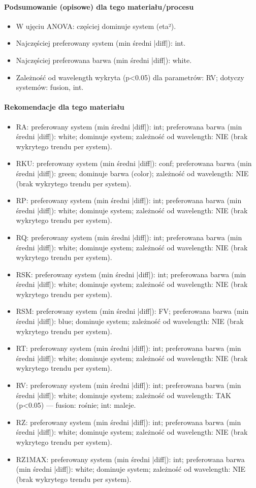 \documentclass[
  10pt,
]{article}
\begin{document}
\paragraph{Podsumowanie (opisowe) dla tego materiału/procesu}
\begin{itemize}
\item W ujęciu ANOVA: częściej dominuje system (eta²).
\item Najczęściej preferowany system (min średni |diff|): int.
\item Najczęściej preferowana barwa (min średni |diff|): white.
\item Zależność od wavelength wykryta (p<0.05) dla parametrów: RV; dotyczy systemów: fusion, int.
\end{itemize}
\paragraph{Rekomendacje dla tego materiału}
\begin{itemize}
\item RA: preferowany system (min średni |diff|): int; preferowana barwa (min średni |diff|): white; dominuje system; zależność od wavelength: NIE (brak wykrytego trendu per system).
\item RKU: preferowany system (min średni |diff|): conf; preferowana barwa (min średni |diff|): green; dominuje barwa (color); zależność od wavelength: NIE (brak wykrytego trendu per system).
\item RP: preferowany system (min średni |diff|): int; preferowana barwa (min średni |diff|): white; dominuje system; zależność od wavelength: NIE (brak wykrytego trendu per system).
\item RQ: preferowany system (min średni |diff|): int; preferowana barwa (min średni |diff|): white; dominuje system; zależność od wavelength: NIE (brak wykrytego trendu per system).
\item RSK: preferowany system (min średni |diff|): int; preferowana barwa (min średni |diff|): white; dominuje system; zależność od wavelength: NIE (brak wykrytego trendu per system).
\item RSM: preferowany system (min średni |diff|): FV; preferowana barwa (min średni |diff|): blue; dominuje system; zależność od wavelength: NIE (brak wykrytego trendu per system).
\item RT: preferowany system (min średni |diff|): int; preferowana barwa (min średni |diff|): white; dominuje system; zależność od wavelength: NIE (brak wykrytego trendu per system).
\item RV: preferowany system (min średni |diff|): int; preferowana barwa (min średni |diff|): white; dominuje system; zależność od wavelength: TAK (p<0.05) — fusion: rośnie; int: maleje.
\item RZ: preferowany system (min średni |diff|): int; preferowana barwa (min średni |diff|): white; dominuje system; zależność od wavelength: NIE (brak wykrytego trendu per system).
\item RZ1MAX: preferowany system (min średni |diff|): int; preferowana barwa (min średni |diff|): white; dominuje system; zależność od wavelength: NIE (brak wykrytego trendu per system).
\end{itemize}
\end{document}
